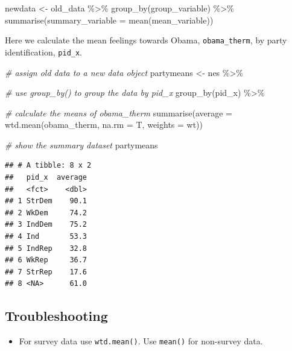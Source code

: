\documentclass[
]{book}
\newenvironment{Shaded}{\begin{snugshade}}{\end{snugshade}}
\newcommand{\AttributeTok}[1]{\textcolor[rgb]{0.77,0.63,0.00}{#1}}
\newcommand{\CommentTok}[1]{\textcolor[rgb]{0.56,0.35,0.01}{\textit{#1}}}
\newcommand{\FunctionTok}[1]{\textcolor[rgb]{0.00,0.00,0.00}{#1}}
\newcommand{\NormalTok}[1]{#1}
\newcommand{\OtherTok}[1]{\textcolor[rgb]{0.56,0.35,0.01}{#1}}
\newcommand{\SpecialCharTok}[1]{\textcolor[rgb]{0.00,0.00,0.00}{#1}}
\providecommand{\tightlist}{%
  \setlength{\itemsep}{0pt}\setlength{\parskip}{0pt}}
\begin{document}
\begin{Shaded}
\begin{Highlighting}[]
\NormalTok{newdata }\OtherTok{\textless{}{-}}\NormalTok{ old\_data }\SpecialCharTok{\%\textgreater{}\%}
  \FunctionTok{group\_by}\NormalTok{(group\_variable) }\SpecialCharTok{\%\textgreater{}\%}
  \FunctionTok{summarise}\NormalTok{(}\AttributeTok{summary\_variable =} \FunctionTok{mean}\NormalTok{(mean\_variable))}
\end{Highlighting}
\end{Shaded}

Here we calculate the mean feelings towards Obama, \texttt{obama\_therm}, by party identification, \texttt{pid\_x}.

\begin{Shaded}
\begin{Highlighting}[]
\CommentTok{\# assign old data to a new data object}
\NormalTok{partymeans }\OtherTok{\textless{}{-}}\NormalTok{ nes }\SpecialCharTok{\%\textgreater{}\%}
  
  \CommentTok{\# use group\_by() to group the data by pid\_x}
  \FunctionTok{group\_by}\NormalTok{(pid\_x) }\SpecialCharTok{\%\textgreater{}\%}
  
  \CommentTok{\# calculate the means of obama\_therm}
  \FunctionTok{summarise}\NormalTok{(}\AttributeTok{average =} \FunctionTok{wtd.mean}\NormalTok{(obama\_therm, }\AttributeTok{na.rm =}\NormalTok{ T,}
                               \AttributeTok{weights =}\NormalTok{ wt))}

\CommentTok{\# show the summary dataset}
\NormalTok{partymeans}
\end{Highlighting}
\end{Shaded}

\begin{verbatim}
## # A tibble: 8 x 2
##   pid_x  average
##   <fct>    <dbl>
## 1 StrDem    90.1
## 2 WkDem     74.2
## 3 IndDem    75.2
## 4 Ind       53.3
## 5 IndRep    32.8
## 6 WkRep     36.7
## 7 StrRep    17.6
## 8 <NA>      61.0
\end{verbatim}

\hypertarget{troubleshooting-18}{%
\subsection{Troubleshooting}\label{troubleshooting-18}}

\begin{itemize}
\tightlist
\item
  For survey data use \texttt{wtd.mean()}. Use \texttt{mean()} for non-survey data.
\end{itemize}

  
\end{document}
